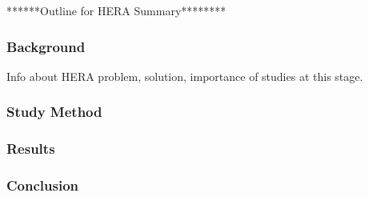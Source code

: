 ******Outline for HERA Summary********

\subsubsection{Background}
Info about HERA problem, solution, importance of studies at this stage.

\subsubsection{Study Method}

\subsubsection{Results}

\subsubsection{Conclusion}